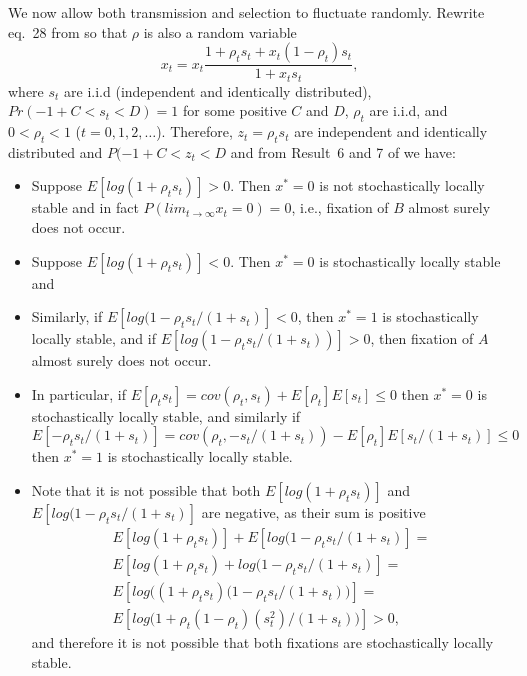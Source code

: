 \documentclass[12pt]{extarticle} %
\begin{document}
We now allow both transmission and selection to fluctuate randomly.
Rewrite eq.~28 from \citet{Ram2018} so that $\rho$ is also a random variable
\begin{equation}
x_t = x_t \frac{1 + \rho_t s_t + x_t (1 - \rho_t) s_t}{1 + x_t s_t},
\end{equation}
where $s_t$ are i.i.d (independent and identically distributed), $Pr(-1+C<s_t<D)=1$ for some positive $C$ and $D$, $\rho_t$ are i.i.d, and  $0<\rho_t<1$ ($t=0,1,2,\ldots$).
Therefore, $z_t = \rho_t s_t$  are independent and identically distributed and $P(-1+C < z_t < D$ and from Result~6 and 7 of \citet{Ram2018} we have:
\begin{itemize}
\item Suppose $E[log(1+\rho_t s_t)]>0$. Then $x^*=0$ is not stochastically locally stable and in fact $P(lim_{t \to \infty} x_t=0) = 0$, i.e., fixation of $B$ almost surely does not occur.
\item Suppose $E[log(1+\rho_t s_t)]<0$. Then $x^*=0$ is stochastically locally stable and 
\item Similarly, if $E[log(1-\rho_t s_t/(1+s_t)]<0$, then $x^*=1$ is stochastically locally stable, and if $E[log(1-\rho_t s_t/(1+s_t))]>0$, then fixation of $A$ almost surely does not occur.
\item In particular, if $E[\rho_t s_t] = cov(\rho_t, s_t) + E[\rho_t] E[s_t] \le 0$ then $x^*=0$ is stochastically locally stable, and similarly if $E[-\rho_t s_t/(1+s_t)] = cov(\rho_t, -s_t/(1+s_t)) - E[\rho_t] E[s_t/(1+s_t)] \le 0$ then $x^*=1$ is stochastically locally stable.
\item Note that it is not possible that both $E[log(1+\rho_t s_t)]$ and $E[log(1-\rho_t s_t/(1+s_t)]$ are negative, as their sum is positive
\begin{multline}
E[log(1+\rho_t s_t)] + E[log(1-\rho_t s_t/(1+s_t)] = \\
E[log(1+\rho_t s_t) + log(1-\rho_t s_t/(1+s_t)]= \\
E[log\big((1+\rho_t s_t)(1-\rho_t s_t/(1+s_t)\big)]= \\
E[log\big( 1+\rho_t(1-\rho_t)(s_t^2)/(1+s_t) \big)] > 0,
\end{multline}
and therefore it is not possible that both fixations are stochastically locally stable.
\end{itemize}
\end{document}
